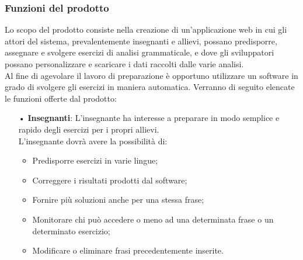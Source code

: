 \subsubsection{Funzioni del prodotto}
Lo scopo del prodotto consiste nella creazione di un'applicazione web in cui gli attori del sistema, prevalentemente insegnanti e allievi, possano predisporre, assegnare e svolgere esercizi di analisi grammaticale, e dove gli sviluppatori possano personalizzare e scaricare i dati raccolti dalle varie analisi.\\
Al fine di agevolare il lavoro di preparazione è opportuno utilizzare un software in grado di svolgere gli esercizi in maniera automatica.
Verranno di seguito elencate le funzioni offerte dal prodotto:
\begin{itemize}
\item[•]\textbf{Insegnanti}:
L'insegnante ha interesse a preparare in modo semplice e rapido degli esercizi per i propri allievi.\\
L'insegnante dovrà avere la possibilità di:
\begin{itemize}
\item Predisporre esercizi in varie lingue;
\item Correggere i risultati prodotti dal software;
\item Fornire più soluzioni anche per una stessa frase;
\item Monitorare chi può accedere o meno ad una determinata frase o un determinato esercizio;
\item Modificare o eliminare frasi precedentemente inserite.
\end{itemize}


\end{itemize}
